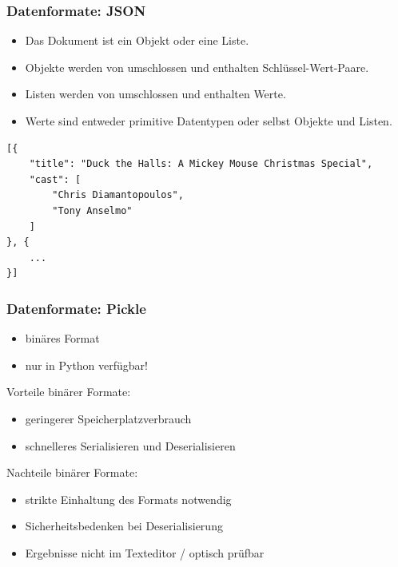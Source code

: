 
\begin{frame}[fragile]
\frametitle{Datenformate: JSON}

\begin{itemize}
\item Das Dokument ist ein Objekt oder eine Liste.
\item Objekte werden von \code{\{\}} umschlossen und enthalten Schlüssel-Wert-Paare.
\item Listen werden von \code{[]} umschlossen und enthalten Werte.
\item Werte sind entweder primitive Datentypen oder selbst Objekte und Listen.
\end{itemize}

\begin{lstlisting}[basicstyle=\tiny\ttfamily]
[{
    "title": "Duck the Halls: A Mickey Mouse Christmas Special",
    "cast": [
        "Chris Diamantopoulos",
        "Tony Anselmo"
    ]
}, {
    ...
}]
\end{lstlisting}

\end{frame}


\begin{frame}[fragile]
\frametitle{Datenformate: Pickle}

\begin{itemize}
\item binäres Format
\item nur in Python verfügbar!
\end{itemize}

Vorteile binärer Formate:
\begin{itemize}
\item geringerer Speicherplatzverbrauch
\item schnelleres Serialisieren und Deserialisieren
\end{itemize}

Nachteile binärer Formate:
\begin{itemize}
\item strikte Einhaltung des Formats notwendig
\item Sicherheitsbedenken bei Deserialisierung
\item Ergebnisse nicht im Texteditor / optisch prüfbar
\end{itemize}

\end{frame}

